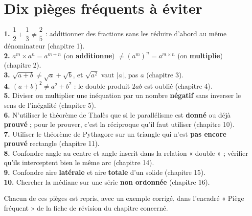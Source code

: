 \section{Dix pièges fréquents à éviter}

\begin{synthese}
\textbf{1.} $\dfrac12+\dfrac13\ne\dfrac25$ : additionner des fractions sans les réduire
d'abord au même dénominateur (chapitre 1).\\[3pt]
\textbf{2.} $a^{m}\times a^{n}=a^{m+n}$ (on \textbf{additionne}) $\ne(a^{m})^{n}=a^{m\times n}$
(on \textbf{multiplie}) (chapitre 2).\\[3pt]
\textbf{3.} $\sqrt{a+b}\ne\sqrt a+\sqrt b$, et $\sqrt{a^{2}}$ vaut $|a|$, pas $a$
(chapitre 3).\\[3pt]
\textbf{4.} $(a+b)^{2}\ne a^{2}+b^{2}$ : le double produit $2ab$ est oublié
(chapitre 4).\\[3pt]
\textbf{5.} Diviser ou multiplier une inéquation par un nombre \textbf{négatif} sans
inverser le sens de l'inégalité (chapitre 5).\\[3pt]
\textbf{6.} N'utiliser le théorème de Thalès que si le parallélisme est \textbf{donné} ou
déjà \textbf{prouvé} ; pour le prouver, c'est la réciproque qu'il faut utiliser (chapitre
10).\\[3pt]
\textbf{7.} Utiliser le théorème de Pythagore sur un triangle qui n'est \textbf{pas encore
prouvé} rectangle (chapitre 11).\\[3pt]
\textbf{8.} Confondre angle au centre et angle inscrit dans la relation « double » ; vérifier
qu'ils interceptent bien le même arc (chapitre 14).\\[3pt]
\textbf{9.} Confondre aire \textbf{latérale} et aire \textbf{totale} d'un solide (chapitre
15).\\[3pt]
\textbf{10.} Chercher la médiane sur une série \textbf{non ordonnée} (chapitre 16).
\end{synthese}

\begin{remarque}
Chacun de ces pièges est repris, avec un exemple corrigé, dans l'encadré « Piège
fréquent » de la fiche de révision du chapitre concerné.
\end{remarque}
